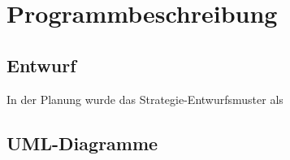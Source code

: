 \chapter{Programmbeschreibung}\label{ch:programmbeschreibung}

\section{Entwurf}\label{sec:entwurf}
In der Planung wurde das Strategie-Entwurfsmuster als
\pagebreak

\section{UML-Diagramme}\label{sec:uml}

\noindent%
\begin{minipage}{\linewidth}%
    \label{fig:klassen-dia}
\end{minipage}

